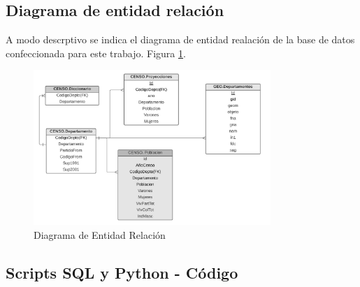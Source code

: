 \documentclass{article}
\theoremstyle{mytheoremstyle}
\theoremstyle{mytheoremstyle}
\theoremstyle{myproblemstyle}
\begin{document}
 \subsection{Diagrama de entidad relación }
  A modo descrptivo se indica el diagrama de entidad realación de la base de datos confeccionada
  para este trabajo. Figura \ref{fig:DER}.
\begin{figure}[htbp]
    \centering
    \includegraphics[width=0.8\textwidth]{img/DER.jpg}
    \caption{Diagrama de Entidad Relación}
    \label{fig:DER}
\end{figure}
\subsection{Scripts  SQL y Python - Código} 
\end{document}
